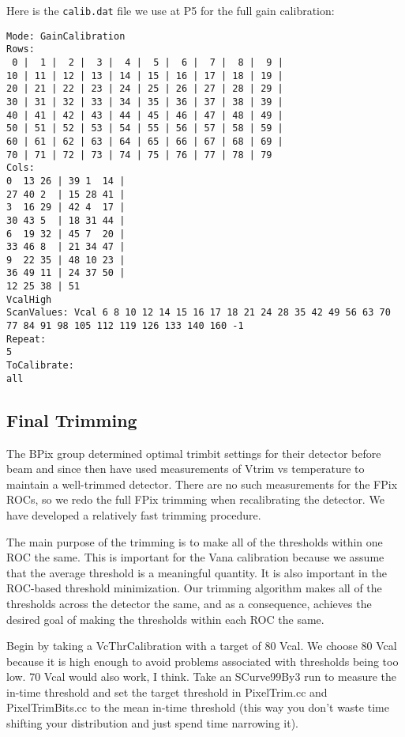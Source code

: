 Here is the \verb|calib.dat| file we use at P5 for the full gain calibration:
\begin{verbatim}
Mode: GainCalibration
Rows:
 0 |  1 |  2 |  3 |  4 |  5 |  6 |  7 |  8 |  9 |
10 | 11 | 12 | 13 | 14 | 15 | 16 | 17 | 18 | 19 |
20 | 21 | 22 | 23 | 24 | 25 | 26 | 27 | 28 | 29 |
30 | 31 | 32 | 33 | 34 | 35 | 36 | 37 | 38 | 39 |
40 | 41 | 42 | 43 | 44 | 45 | 46 | 47 | 48 | 49 |
50 | 51 | 52 | 53 | 54 | 55 | 56 | 57 | 58 | 59 |
60 | 61 | 62 | 63 | 64 | 65 | 66 | 67 | 68 | 69 |
70 | 71 | 72 | 73 | 74 | 75 | 76 | 77 | 78 | 79
Cols:
0  13 26 | 39 1  14 | 
27 40 2  | 15 28 41 |
3  16 29 | 42 4  17 | 
30 43 5  | 18 31 44 |
6  19 32 | 45 7  20 | 
33 46 8  | 21 34 47 |
9  22 35 | 48 10 23 | 
36 49 11 | 24 37 50 |
12 25 38 | 51
VcalHigh
ScanValues: Vcal 6 8 10 12 14 15 16 17 18 21 24 28 35 42 49 56 63 70 77 84 91 98 105 112 119 126 133 140 160 -1
Repeat:
5
ToCalibrate:
all
\end{verbatim}


\subsection{Final Trimming}

The BPix group determined optimal trimbit settings for their detector before beam and since then have used
measurements of Vtrim vs temperature to maintain a well-trimmed detector.  There are no
such measurements for the FPix ROCs, so we redo the full FPix trimming when recalibrating the detector.
We have developed a relatively fast trimming procedure.

The main purpose of the trimming is to make all of the thresholds within one ROC the same.  
This is important for the Vana calibration because we assume that the average threshold 
is a meaningful quantity.  It is also important in the ROC-based threshold minimization.
Our trimming algorithm makes all of the thresholds across the detector the same, and as a consequence,
 achieves the desired goal of making the thresholds within each ROC the same.

Begin by taking a VcThrCalibration with a target of 80 Vcal.  We choose 80 Vcal because it is high
enough to avoid problems associated with thresholds being too low.  70 Vcal would also work, I think.
Take an SCurve99By3 run to measure the in-time threshold and set the target threshold in PixelTrim.cc and
PixelTrimBits.cc to the mean in-time threshold (this way you don't waste time shifting your distribution and
just spend time narrowing it).

